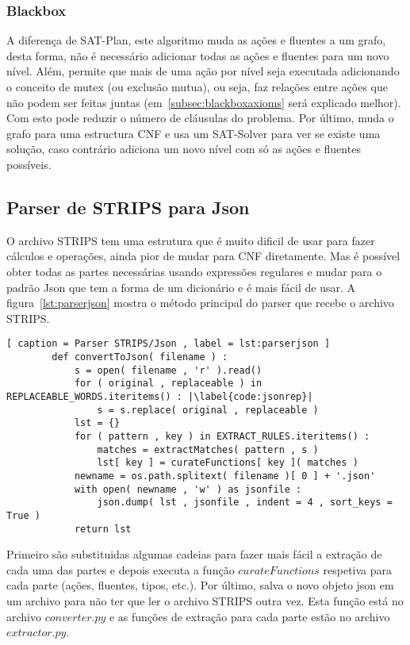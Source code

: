 	\subsubsection{Blackbox}
	\label{subsub:blackbox}
		A diferença de SAT-Plan, este algoritmo muda as ações e fluentes a um grafo, desta forma, não é necessário adicionar todas as ações e fluentes para um novo nível. Além, permite que mais de uma ação por nível seja executada adicionando o conceito de mutex (ou exclusão mutua), ou seja, faz relações entre ações que não podem ser feitas juntas (em~\ref{subsec:blackboxaxioms} será explicado melhor). Com esto pode reduzir o número de cláusulas do problema. Por último, muda o grafo para uma estructura CNF e usa um SAT-Solver para ver se existe uma solução, caso contrário adiciona um novo nível com só as ações e fluentes possíveis.

\subsection{Parser de STRIPS para Json}
\label{subsec:stripsjson}
	O archivo STRIPS tem uma estrutura que é muito dificil de usar para fazer cálculos e operações, ainda pior de mudar para CNF diretamente. Mas é possível obter todas as partes necessárias usando expressões regulares e mudar para o padrão Json que tem a forma de um dicionário e é mais fácil de usar. A figura~\ref{lst:parserjson} mostra o método principal do parser que recebe o archivo STRIPS.
	\renewcommand \lstlistingname{Código}
	\begin{lstlisting}[ caption = Parser STRIPS/Json , label = lst:parserjson ]
		def convertToJson( filename ) :
			s = open( filename , 'r' ).read()
			for ( original , replaceable ) in REPLACEABLE_WORDS.iteritems() : |\label{code:jsonrep}|
				s = s.replace( original , replaceable )
			lst = {}
			for ( pattern , key ) in EXTRACT_RULES.iteritems() :
				matches = extractMatches( pattern , s )
				lst[ key ] = curateFunctions[ key ]( matches )
			newname = os.path.splitext( filename )[ 0 ] + '.json'
			with open( newname , 'w' ) as jsonfile :
				json.dump( lst , jsonfile , indent = 4 , sort_keys = True )
			return lst
	\end{lstlisting}
	Primeiro são substituidas algumas cadeias para fazer mais fácil a extração de cada uma das partes e depois executa a função $curateFunctions$ respetiva para cada parte (ações, fluentes, tipos, etc.). Por último, salva o novo objeto json em um archivo para não ter que ler o archivo STRIPS outra vez. Esta função está no archivo ${converter.py}$ e as funções de extração para cada parte estão no archivo ${extractor.py}$.

